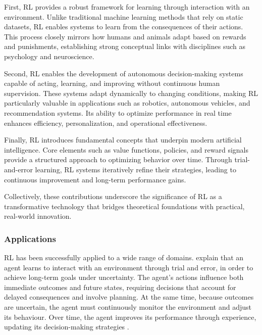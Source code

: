 \documentclass[
  authoryear,
  preprint]{elsarticle}
\begin{document}
First, RL provides a robust framework for learning through interaction
with an environment. Unlike traditional machine learning methods that
rely on static datasets, RL enables systems to learn from the
consequences of their actions. This process closely mirrors how humans
and animals adapt based on rewards and punishments, establishing strong
conceptual links with disciplines such as psychology and neuroscience.

Second, RL enables the development of autonomous decision-making systems
capable of acting, learning, and improving without continuous human
supervision. These systems adapt dynamically to changing conditions,
making RL particularly valuable in applications such as robotics,
autonomous vehicles, and recommendation systems. Its ability to optimize
performance in real time enhances efficiency, personalization, and
operational effectiveness.

Finally, RL introduces fundamental concepts that underpin modern
artificial intelligence. Core elements such as value functions,
policies, and reward signals provide a structured approach to optimizing
behavior over time. Through trial-and-error learning, RL systems
iteratively refine their strategies, leading to continuous improvement
and long-term performance gains.

Collectively, these contributions underscore the significance of RL as a
transformative technology that bridges theoretical foundations with
practical, real-world innovation.

\subsubsection{Applications}\label{applications}

RL has been successfully applied to a wide range of domains.
\citet{SuttonBarto2020} explain that an agent learns to interact with an
environment through trial and error, in order to achieve long-term goals
under uncertainty. The agent's actions influence both immediate outcomes
and future states, requiring decisions that account for delayed
consequences and involve planning. At the same time, because outcomes
are uncertain, the agent must continuously monitor the environment and
adjust its behaviour. Over time, the agent improves its performance
through experience, updating its decision-making strategies
\citep{SuttonBarto2020}.
\end{document}
